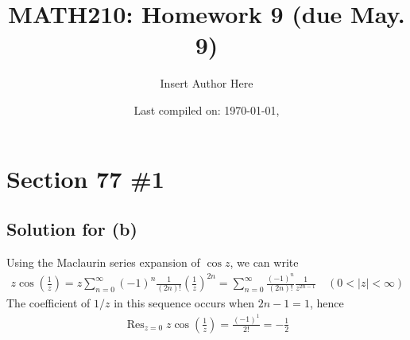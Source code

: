 \documentclass{scrartcl}
\title{MATH210: Homework 9 (due May. 9)}
\author{Insert Author Here}
\date{Last compiled on: \today, \currenttime}
\DeclareMathOperator*{\Res}{Res}
\begin{document}
\maketitle

\section{Section 77 \#1}
\subsection{Solution for (b)}
Using the Maclaurin series expansion of \(\cos z\), we can write
\begin{align*}
  z \cos \left( \frac{1}{z} \right)
  = z \sum^\infty_{n = 0} (-1)^n \frac{1}{(2n)!} \left( \frac{1}{z} \right)^{2n}
  = \sum^\infty_{n = 0} \frac{(-1)^n}{(2n)!} \frac{1}{z^{2n - 1}} \quad (0 < |z| < \infty)
\end{align*}
The coefficient of \(1 / z\) in this sequence occurs when \(2n - 1 = 1\), hence
\begin{align*}
  \Res_{z = 0} z \cos \left( \frac{1}{z} \right) = \frac{(-1)^1}{2!} = -\frac{1}{2}
\end{align*}
\end{document}
